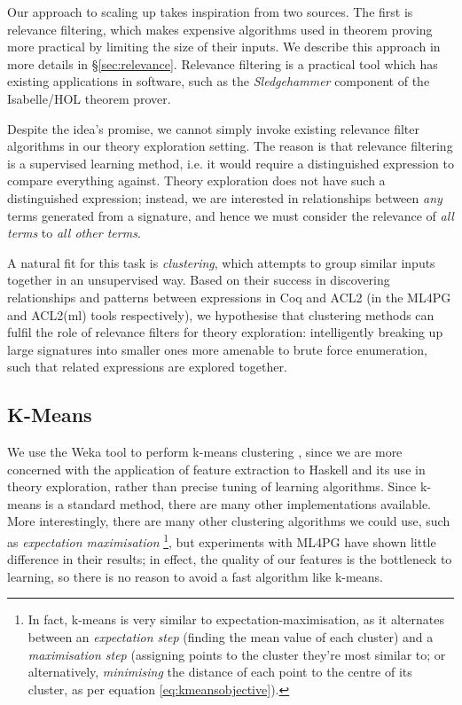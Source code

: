 Our approach to scaling up \qspec{} takes inspiration from two sources. The
first is relevance filtering, which makes expensive algorithms used in theorem
proving more practical by limiting the size of their inputs. We describe this
approach in more details in \S \ref{sec:relevance}. Relevance filtering is a
practical tool which has existing applications in software, such as the
\emph{Sledgehammer} component of the Isabelle/HOL theorem prover.

Despite the idea's promise, we cannot simply invoke existing relevance filter
algorithms in our theory exploration setting. The reason is that relevance
filtering is a supervised learning method, i.e. it would require a distinguished
expression to compare everything against. Theory exploration does not have such
a distinguished expression; instead, we are interested in relationships between
\emph{any} terms generated from a signature, and hence we must consider the
relevance of \emph{all terms} to \emph{all other terms}.

A natural fit for this task is \emph{clustering}, which attempts to group
similar inputs together in an unsupervised way. Based on their success in
discovering relationships and patterns between expressions in Coq and ACL2 (in
the ML4PG and ACL2(ml) tools respectively), we hypothesise that clustering
methods can fulfil the role of relevance filters for theory exploration:
intelligently breaking up large signatures into smaller ones more amenable to
brute force enumeration, such that related expressions are explored together.

\subsection{K-Means}

We use the Weka tool to perform k-means clustering
\cite{Holmes.Donkin.Witten:1994}, since we are more concerned with the
application of feature extraction to Haskell and its use in theory exploration,
rather than precise tuning of learning algorithms. Since k-means is a standard
method, there are many other implementations available. More interestingly,
there are many other clustering algorithms we could use, such as
\emph{expectation maximisation} \footnote{In fact, k-means is very similar to
  expectation-maximisation, as it alternates between an \emph{expectation step}
  (finding the mean value of each cluster) and a \emph{maximisation step}
  (assigning points to the cluster they're most similar to; or alternatively,
  \emph{minimising} the distance of each point to the centre of its cluster, as
  per equation \ref{eq:kmeansobjective}).}, but experiments with ML4PG have
shown little difference in their results; in effect, the quality of our features
is the bottleneck to learning, so there is no reason to avoid a fast algorithm
like k-means.

